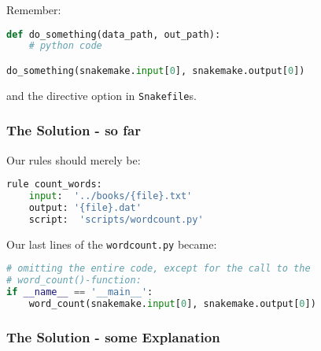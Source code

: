 \begin{frame}[fragile]
  \frametitle{}
  Remember:
  \begin{lstlisting}[language=Python,style=Python]
def do_something(data_path, out_path):
    # python code

do_something(snakemake.input[0], snakemake.output[0])
  \end{lstlisting}
  and the  directive option in \texttt{Snakefile}s. 
\end{frame}

\begin{frame}[fragile]
  \frametitle{The Solution - so far}
  Our  rules should merely be:
  \begin{lstlisting}[language=Python,style=Python]
rule count_words:
    input:  '../books/{file}.txt'
    output: '{file}.dat'
    script:  'scripts/wordcount.py'
  \end{lstlisting}
  Our last lines of the \texttt{wordcount.py} became:
  \begin{lstlisting}[language=Python,style=Python]
# omitting the entire code, except for the call to the
# word_count()-function:
if __name__ == '__main__':
    word_count(snakemake.input[0], snakemake.output[0])
  \end{lstlisting}
  
\end{frame}

\begin{frame}[fragile]
  \frametitle{The Solution - some Explanation}
  \vfill
  \vfill
\end{frame}





